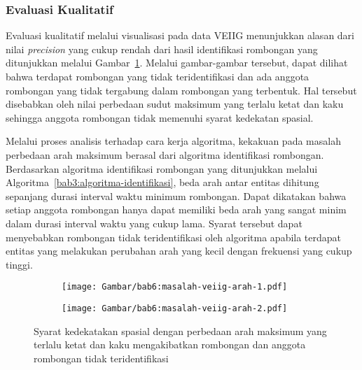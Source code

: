 \subsubsection{Evaluasi Kualitatif}
\label{subsubsec:veiig-qualitative}

Evaluasi kualitatif melalui visualisasi pada data VEIIG menunjukkan alasan dari nilai \textit{precision} yang cukup rendah dari hasil identifikasi rombongan yang ditunjukkan melalui Gambar~\ref{bab6:masalah-veiig-arah}. Melalui gambar-gambar tersebut, dapat dilihat bahwa terdapat rombongan yang tidak teridentifikasi dan ada anggota rombongan yang tidak tergabung dalam rombongan yang terbentuk. Hal tersebut disebabkan oleh nilai perbedaan sudut maksimum yang terlalu ketat dan kaku sehingga anggota rombongan tidak memenuhi syarat kedekatan spasial.

Melalui proses analisis terhadap cara kerja algoritma, kekakuan pada masalah perbedaan arah maksimum berasal dari algoritma identifikasi rombongan. Berdasarkan algoritma identifikasi rombongan yang ditunjukkan melalui Algoritma~\ref{bab3:algoritma-identifikasi}, beda arah antar entitas dihitung sepanjang durasi interval waktu minimum rombongan. Dapat dikatakan bahwa setiap anggota rombongan hanya dapat memiliki beda arah yang sangat minim dalam durasi interval waktu yang cukup lama. Syarat tersebut dapat menyebabkan rombongan tidak teridentifikasi oleh algoritma apabila terdapat entitas yang melakukan perubahan arah yang kecil dengan frekuensi yang cukup tinggi.

\begin{figure}[h]
    \centering
    \captionsetup{width=.65\textwidth}
    \begin{subfigure}[b]{0.235\textwidth}
        \centering
        \texttt{[image: Gambar/bab6:masalah-veiig-arah-1.pdf]}
    \end{subfigure}
    \begin{subfigure}[b]{0.235\textwidth}
        \centering
        \texttt{[image: Gambar/bab6:masalah-veiig-arah-2.pdf]}
    \end{subfigure}
    \caption[Masalah perbedaan arah maksimum pada data VEIIG]{Syarat kedekatakan spasial dengan perbedaan arah maksimum yang terlalu ketat dan kaku mengakibatkan rombongan dan anggota rombongan tidak teridentifikasi}
    \label{bab6:masalah-veiig-arah}
\end{figure}

